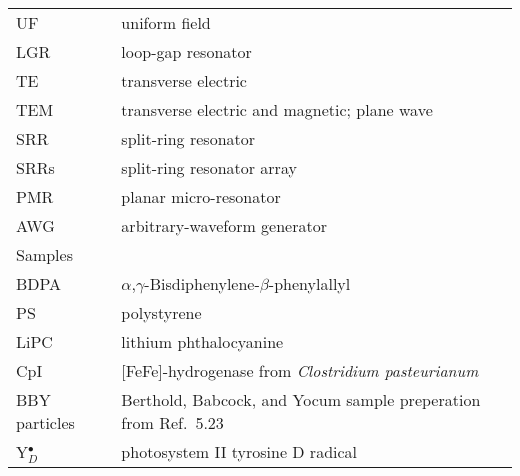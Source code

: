\documentclass[11pt,a4paper,openany,twoside,english,titlepage=true]{scrbook}
\newcounter{Seitenzahl}%
\begin{document}
\begin{table}[ht]
\begin{tabular}{ll}
UF              & uniform field \\ 
LGR             & loop-gap resonator \\ 
TE              & transverse electric \\
TEM             & transverse electric and magnetic; plane wave \\
SRR             & split-ring resonator \\
SRRs            & split-ring resonator array \\
PMR             & planar micro-resonator \\ 
AWG             & arbitrary-waveform generator \\ \hline \hline
\rowcolor{LightCyan}
Samples         & \\ \hline
BDPA            & $\alpha$,$\gamma$-Bisdiphenylene-$\beta$-phenylallyl \\
PS              & polystyrene \\
LiPC            & lithium phthalocyanine \\
CpI             & [FeFe]-hydrogenase from \textit{Clostridium pasteurianum} \\
BBY particles   & Berthold, Babcock, and Yocum sample preperation from Ref.~5.23\\
Y$_D^\bullet$   & photosystem II tyrosine D radical \\ \hline \hline
\end{tabular}\newpage
{}
\end{table}
\newpage


\cleardoublepage
\setcounter{Seitenzahl}{\value{page}}
\setcounter{page}{0}
\mainmatter









\begin{appendices}




%
\end{appendices}

\backmatter
{}
\end{document}

